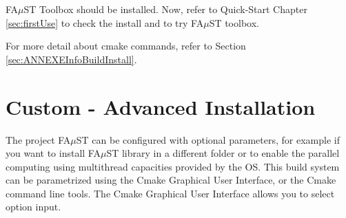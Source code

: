 FA$\mu$ST Toolbox should be installed. Now, refer to Quick-Start Chapter \ref{sec:firstUse} to check the install and to try FA$\mu$ST toolbox.

For more detail about cmake commands, refer to Section \ref{sec:ANNEXEInfoBuildInstall}.



\section{Custom - Advanced Installation}\label{sec:WinCustomInstall}

The project FA$\mu$ST can be configured with optional parameters, for example if you want to install FA$\mu$ST library in a different folder or to enable the parallel computing using multithread capacities provided by the OS. This build system can be parametrized using the Cmake Graphical User Interface, or the Cmake command line tools. 
The Cmake Graphical User Interface allows you to select option input. 


